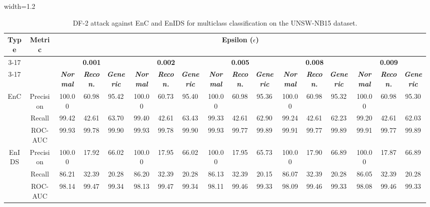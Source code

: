 \documentclass[conference]{IEEEtran}
\begin{document}
	\begin{table}[H]
		\caption{DF-2 attack against EnC and EnIDS for multiclass classification on the UNSW-NB15 dataset.}
		\small
		\setlength{\tabcolsep}{0.1pt}
		\centering
		\label{tab:unsw_multi_df}
		\hspace*{-1.6cm}
		\begin{adjustbox}{width=1.2\textwidth}
			\begin{tabular}{|c|c|c|c|c|c|c|c|c|c|c|c|c|c|c|c|c|}
				\hline
				\multirow{4}{*}{\textbf{Type}} & \multirow{4}{*}{\textbf{Metric}}& \multicolumn{15}{c|}{\textbf{Epsilon ($\epsilon$)}} \\
				\cline{3-17}
				&  & \multicolumn{3}{c|}{\textbf{0.001}} & \multicolumn{3}{c|}{\textbf{0.002}} & \multicolumn{3}{c|}{\textbf{0.005}} & \multicolumn{3}{c|}{\textbf{0.008}} & \multicolumn{3}{c|}{\textbf{0.009}} 
				\\
				\cline{3-17}
				&  & \textbf{\textsl{Normal}} & \textbf{\textsl{Recon.}} & \textbf{\textsl{Generic}} & \textbf{\textsl{Normal}} & \textbf{\textsl{Recon.}} & \textbf{\textsl{Generic}} & \textbf{\textsl{Normal}} & \textbf{\textsl{Recon.}} & \textbf{\textsl{Generic}} & \textbf{\textsl{Normal}} & \textbf{\textsl{Recon.}} & \textbf{\textsl{Generic}} & \textbf{\textsl{Normal}} & \textbf{\textsl{Recon.}} & \textbf{\textsl{Generic}}
				\\
				\hline
				\multirow{3}{*}{EnC} & Precision & 100.00 & 60.98 & 95.42 & 100.00 & 60.73 & 95.40 & 100.00 & 60.98 & 95.36 & 100.00 & 60.98 & 95.32 & 100.00 & 60.98 & 95.30
				\\
				
				& Recall & 99.42 & 42.61 & 63.70 & 99.40 & 42.61 & 63.43 & 99.33 & 42.61 & 62.90 & 99.24 & 42.61 & 62.23 & 99.20 & 42.61 & 62.03
				\\
				
				& ROC-AUC & 99.93 & 99.78 & 99.90 & 99.93 & 99.78 & 99.90 & 99.93 & 99.77 & 99.89 & 99.91 & 99.77 & 99.89 & 99.91 & 99.77 & 99.89
				\\
				\hline
				\multirow{3}{*}{EnIDS} & Precision & \cellcolor{blue!20}100.00 & 17.92 & 66.02 & \cellcolor{blue!20}100.00 & 17.95 & 66.02 & \cellcolor{blue!20}100.00 & 17.95 & 65.73 & \cellcolor{blue!20}100.00 & 17.90 & 66.89 & \cellcolor{blue!20}100.00 & 17.87 & 66.89
				\\
				
				& Recall & 86.21 & 32.39 & 20.28 & 86.20 & 32.39 & 20.28 & 86.13 & 32.39 & 20.15 & 86.07 & 32.39 & 20.28 & 86.05 & 32.39 & 20.28
				\\
				
				& ROC-AUC & 98.14 & 99.47 & 99.34 & 98.13 & 99.47 & 99.34 & 98.11 & 99.46 & 99.33 & 98.09 & 99.46 & 99.33 & 98.08 & 99.46 & 99.33
				\\
				\hline
			\end{tabular}	
		\end{adjustbox}	
	\end{table}
	
\end{document}
